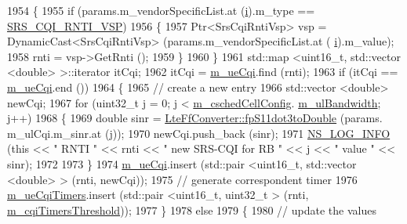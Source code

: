 \begin{DoxyCode}
1954           \{
1955             \textcolor{keywordflow}{if} (params.m\_vendorSpecificList.at (\hyperlink{bernuolliDistribution_8m_a6f6ccfcf58b31cb6412107d9d5281426}{i}).m\_type == \hyperlink{lte-vendor-specific-parameters_8h_a3b5e6e766032ab4a8e374a1cfd237a26}{SRS\_CQI\_RNTI\_VSP})
1956               \{
1957                 Ptr<SrsCqiRntiVsp> vsp = DynamicCast<SrsCqiRntiVsp> (params.m\_vendorSpecificList.at (
      \hyperlink{bernuolliDistribution_8m_a6f6ccfcf58b31cb6412107d9d5281426}{i}).m\_value);
1958                 rnti = vsp->GetRnti ();
1959               \}
1960           \}
1961         std::map <uint16\_t, std::vector <double> >::iterator itCqi;
1962         itCqi = \hyperlink{classns3_1_1FdBetFfMacScheduler_a8cb7a6ccbbc1ee0a6dd2872cdc9d131e}{m\_ueCqi}.find (rnti);
1963         \textcolor{keywordflow}{if} (itCqi == \hyperlink{classns3_1_1FdBetFfMacScheduler_a8cb7a6ccbbc1ee0a6dd2872cdc9d131e}{m\_ueCqi}.end ())
1964           \{
1965             \textcolor{comment}{// create a new entry}
1966             std::vector <double> newCqi;
1967             \textcolor{keywordflow}{for} (uint32\_t j = 0; j < \hyperlink{classns3_1_1FdBetFfMacScheduler_a52a10018d36c6a2e69820346a327dfc9}{m\_cschedCellConfig}.
      \hyperlink{structns3_1_1FfMacCschedSapProvider_1_1CschedCellConfigReqParameters_a5ab5b102878e6e7e7727a14af4a64d2f}{m\_ulBandwidth}; j++)
1968               \{
1969                 \textcolor{keywordtype}{double} sinr = \hyperlink{classns3_1_1LteFfConverter_aa5d8c2a8f988dbd63da91818c18666eb}{LteFfConverter::fpS11dot3toDouble} (params.
      m\_ulCqi.m\_sinr.at (j));
1970                 newCqi.push\_back (sinr);
1971                 \hyperlink{group__logging_gafbd73ee2cf9f26b319f49086d8e860fb}{NS\_LOG\_INFO} (\textcolor{keyword}{this} << \textcolor{stringliteral}{" RNTI "} << rnti << \textcolor{stringliteral}{" new SRS-CQI for RB  "} << j << \textcolor{stringliteral}{" value
       "} << sinr);
1972 
1973               \}
1974             \hyperlink{classns3_1_1FdBetFfMacScheduler_a8cb7a6ccbbc1ee0a6dd2872cdc9d131e}{m\_ueCqi}.insert (std::pair <uint16\_t, std::vector <double> > (rnti, newCqi));
1975             \textcolor{comment}{// generate correspondent timer}
1976             \hyperlink{classns3_1_1FdBetFfMacScheduler_ae6bef84c07e9ff1f50541f7f286114c6}{m\_ueCqiTimers}.insert (std::pair <uint16\_t, uint32\_t > (rnti, 
      \hyperlink{classns3_1_1FdBetFfMacScheduler_ad25e8d5207cfa78201a9af0d38aab817}{m\_cqiTimersThreshold}));
1977           \}
1978         \textcolor{keywordflow}{else}
1979           \{
1980             \textcolor{comment}{// update the values}

\end{DoxyCode}
